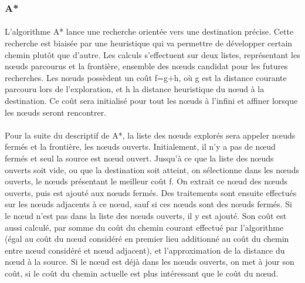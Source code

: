 \documentclass[pidr]{tnreport}
\begin{document}
			\subsubsection{A*}	
\paragraph{}
L'algorithme A* lance une recherche orientée vers une destination précise. Cette recherche est biaisée par une heuristique qui va permettre de développer certain chemin plutôt que d'autre. Les calculs s'effectuent sur deux listes, représentant les nœuds parcourus et la frontière, ensemble des nœuds candidat pour les futures recherches. Les nœuds possèdent un coût f=g+h, où g est la distance courante parcouru lors de l'exploration, et h la distance heuristique du nœud à la destination. Ce coût sera initialisé pour tout les nœuds à l'infini et affiner lorsque les nœuds seront rencontrer. 

\paragraph{}
Pour la suite du descriptif de A*, la liste des nœuds explorés sera appeler nœuds fermés et la frontière, les nœuds ouverts. Initialement, il n'y a pas de nœud fermés et seul la source est nœud ouvert. Jusqu'à ce que la liste des nœuds ouverts soit vide, ou que la destination soit atteint, on sélectionne dans les nœuds ouverts, le nœuds présentant le meilleur coût f. On extrait ce nœud des nœuds ouverts, puis est ajouté aux nœuds fermés. Des traitements sont ensuite effectués sur les nœuds adjacents à ce nœud, sauf si ces nœuds sont des nœuds fermés. Si le nœud n'est pas dans la liste des nœuds ouverts, il y est ajouté. Son coût est aussi calculé, par somme du coût du chemin courant effectué par l'algorithme (égal au coût du nœud considéré en premier lieu additionné au coût du chemin entre nœud considéré et nœud adjacent), et l'approximation de la distance du nœud à la source. Si le nœud est déjà dans les nœuds ouverts, on met à jour son coût, si le coût du chemin actuelle est plus intéressant que le coût du nœud.
\end{document}
